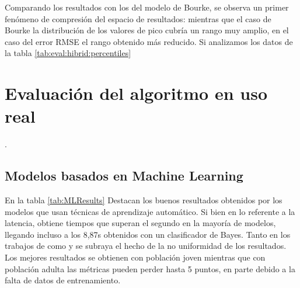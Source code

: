 Comparando los resultados con los del modelo de Bourke, se observa un primer fenómeno de compresión del espacio de resultados: mientras que el caso de Bourke la distribución de los valores de pico cubría un rango muy amplio, en el caso del error RMSE el rango obtenido más reducido. Si analizamos los datos de la tabla \ref{tab:eval:hibrid:percentiles} 




\section{Evaluación del algoritmo en uso real}\label{sec:eval:real}

.



\subsection{Modelos basados en Machine Learning}

En la tabla \ref{tab:MLResults} Destacan los buenos resultados obtenidos por los modelos que usan técnicas de aprendizaje automático. Si bien en lo referente a la latencia, \cite{Liu2020} obtiene tiempos que superan el segundo en la mayoría de modelos, llegando incluso a los 8,87s obtenidos con un clasificador de Bayes. Tanto en los trabajos de \cite{Liu2020} como \cite{Musci2020} y \cite{Torti2018} se subraya el hecho de la no uniformidad de los resultados. Los mejores resultados se obtienen con población joven mientras que con población adulta las métricas pueden perder hasta 5 puntos, en parte debido a la falta de datos de entrenamiento.


